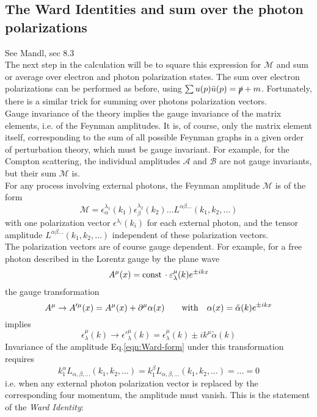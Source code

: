 \documentclass[TheoreticalPhy_ModB.tex]{subfiles}
\begin{document}
\subsection{The Ward Identities and sum over the photon polarizations}
\textsf{See Mandl, sec 8.3}\\
The next step in the calculation will be to square this expression for $\mathcal M$ and sum or average over electron and photon polarization states. The sum over electron polarizations can be performed as before, using $\sum u(p)\bar u(p)=\slashed p+m$. Fortunately, there is a similar trick for summing over photons polarization vectors.\\
Gauge invariance of the theory implies the gauge invariance of the matrix elements, i.e. of the Feynman amplitudes. It is, of course, only the matrix element itself, corresponding to the sum of all possible Feynman graphs in a given order of perturbation theory, which must be gauge invariant. For example, for the Compton scattering, the individual amplitudes $\mathcal A$ and $\mathcal B$ are not gauge invariants, but their sum $\mathcal M$ is.\\
For any process involving external photons, the Feynman amplitude $\mathcal M$ is of the form
\begin{equation}\label{eqn:Ward-form}
\mathcal M=\epsilon_\alpha^{\lambda_1}(k_1)\epsilon_\beta^{\lambda_2}(k_2)\dots L^{\alpha\beta\dots}(k_1,k_2,\dots)
\end{equation}
with one polarization vector $\epsilon^{\lambda_i}(k_i)$ for each external photon, and the tensor amplitude $L^{\alpha\beta\dots}(k_1,k_2,\dots)$ independent of these polarization vectors.\\
The polarization vectors are of course gauge dependent. For example, for a free photon described in the Lorentz gauge by the plane wave
\[A^\mu(x)=\textup{const}\,\cdot\epsilon_\lambda^\mu(k)e^{\pm ikx}\]
the gauge transformation
\[A^\mu\rightarrow A'^\mu(x)=A^\mu(x)+\partial^\mu\alpha(x)\qquad\textup{with}\quad \alpha(x)=\tilde\alpha(k)e^{\pm ikx}\]
implies
\[\epsilon_\lambda^\mu(k)\rightarrow{\epsilon'}_\lambda^{\mu}(k)=\epsilon_\lambda^\mu(k)\pm ik^\mu\tilde\alpha(k)\]
Invariance of the amplitude Eq.\eqref{eqn:Ward-form} under this transformation requires
\[k^\alpha_1L_{\alpha,\beta,\dots}(k_1,k_2,\dots)=k^\beta_1L_{\alpha,\beta,\dots}(k_1,k_2,\dots)=\dots=0\]
i.e. when any external photon polarization vector is replaced by the corresponding four momentum, the amplitude must vanish. This is the statement of the \emph{Ward Identity}:
\end{document}
